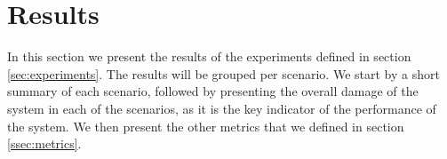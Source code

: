 \section{Results}
\label{sec:results}
In this section we present the results of the experiments defined in section \ref{sec:experiments}. The results will be grouped per scenario. We start by a short summary of each scenario, followed by presenting the overall damage of the system in each of the scenarios, as it is the key indicator of the performance of the system. We then present the other metrics that we defined in section \ref{ssec:metrics}.




